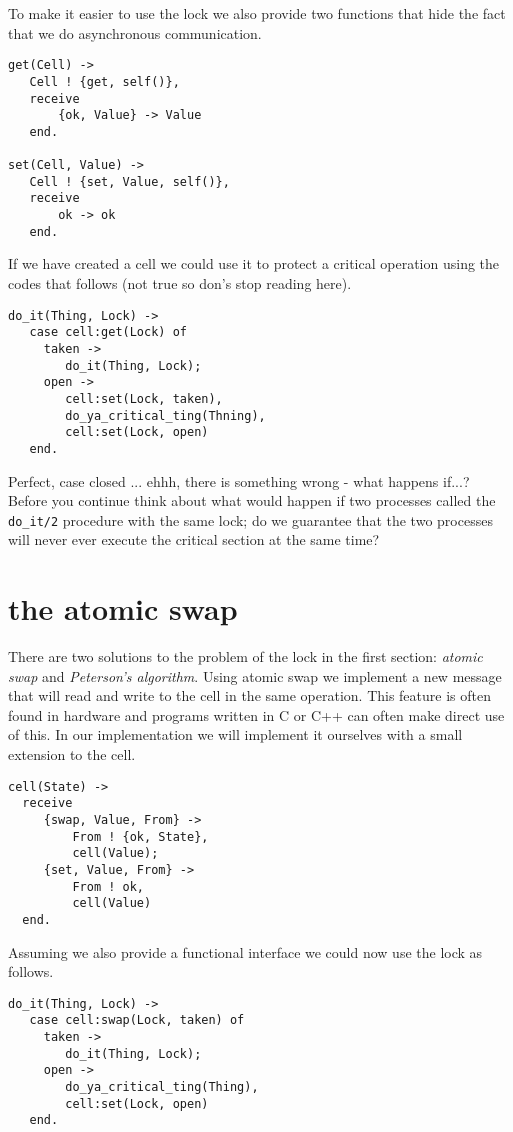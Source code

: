 \documentclass[a4paper,11pt]{article}
\begin{document}
To make it easier to use the lock we also provide two functions that
hide the fact that we do asynchronous communication.

\begin{verbatim}
get(Cell) ->
   Cell ! {get, self()},
   receive 
       {ok, Value} -> Value
   end.   

set(Cell, Value) ->
   Cell ! {set, Value, self()},
   receive 
       ok -> ok
   end.
\end{verbatim}

If we have created a cell we could use it to protect a critical
operation using the codes that follows (not true so don's stop reading
here).

\begin{verbatim}
do_it(Thing, Lock) ->
   case cell:get(Lock) of
     taken ->
        do_it(Thing, Lock);
     open -> 
        cell:set(Lock, taken),
        do_ya_critical_ting(Thning),
        cell:set(Lock, open)
   end.
\end{verbatim}

Perfect, case closed ... ehhh, there is something wrong - what happens
if...? Before you continue think about what would happen if two
processes called the {\tt do\_it/2} procedure with the same lock; do we
guarantee that the two processes will never ever execute the critical
section at the same time?

\section{the atomic swap}

There are two solutions to the problem of the lock in the first
section: {\em atomic swap} and {\em Peterson's algorithm}. Using atomic
swap we implement a new message that will read and write to the cell
in the same operation. This feature is often found in hardware and
programs written in C or C++ can often make direct use of this. In our
implementation we will implement it ourselves with a small extension to the cell. 

\begin{verbatim}
cell(State) ->
  receive
     {swap, Value, From} -> 
         From ! {ok, State},
         cell(Value);
     {set, Value, From} -> 
         From ! ok, 
         cell(Value)
  end.
\end{verbatim}

Assuming we also provide a functional interface we could now use the lock as follows.

\begin{verbatim}
do_it(Thing, Lock) ->
   case cell:swap(Lock, taken) of
     taken ->
        do_it(Thing, Lock);
     open -> 
        do_ya_critical_ting(Thing),
        cell:set(Lock, open)
   end.
\end{verbatim}
\end{document}
